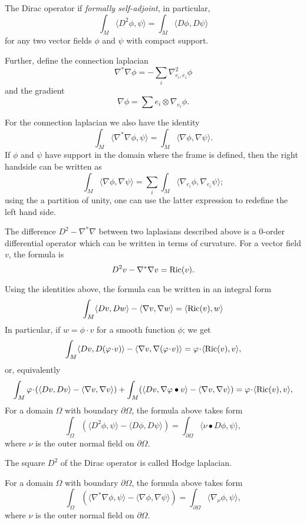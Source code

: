 The Dirac operator if \emph{formally self-adjoint}, in particular,
\[\int_M \langle D^2\phi,\psi\rangle=\int_M \langle D\phi,D\psi\rangle\]
for any two vector fields $\phi$ and $\psi$ with compact support.

Further, define the connection laplacian
\[\nabla^*\nabla\phi =-\sum_i\nabla^2_{e_i,e_i}\phi\]
and the gradient
\[\nabla \phi=\sum e_i\otimes \nabla_{e_i}\phi.\]

For the connection laplacian we also have the identity
\[\int_M \langle \nabla^*\nabla\phi,\psi\rangle
=
\int_M \langle \nabla\phi,\nabla\psi\rangle.\]
If $\phi$ and $\psi$ have support in the domain where the frame is defined, then the right handside can be written as 
\[\int_M \langle \nabla\phi,\nabla\psi\rangle=\sum_i\int_M\langle \nabla_{e_i}\phi,\nabla_{e_i}\psi\rangle;\]
using the a partition of unity, one can use the latter expression to redefine the left hand side. 

The difference $D^2-\nabla^*\nabla$ between two laplasians described above is a 0-order differential operator which can be written in terms of curvature.
For a vector field $v$, the formula is 
\[D^2v-\nabla^*\nabla v=\operatorname{\rm Ric}(v).\]

Using the identities above, the formula can be written in an integral form
\[\int_M \langle Dv,Dw\rangle -\langle \nabla v,\nabla w\rangle=\langle \operatorname{\rm Ric}(v),w\rangle\]
In particular, if $w=\phi \cdot v$ for a smooth function $\phi$;
we get
\[\int_M \langle Dv,D(\phi\cdot v)\rangle -\langle \nabla v,\nabla(\phi\cdot v) \rangle=\phi\cdot\langle \Ric(v), v\rangle,\]
or, equivalently
\[\int_M \phi\cdot(\langle Dv,D v\rangle -\langle \nabla v,\nabla v \rangle)
+
\int_M (\langle Dv,\nabla \phi \bullet v\rangle -\langle \nabla v,\nabla v \rangle)
=
\phi\cdot\langle \Ric(v), v\rangle,\]
For a domain $\Omega$ with boundary $\partial \Omega$, the formula above takes form
\[\int_\Omega (\langle D^2\phi,\psi\rangle- \langle D\phi,D\psi\rangle)
=
\int_{\partial \Omega}\langle \nu\bullet D\phi,\psi\rangle,\]
where $\nu$ is the outer normal field on $\partial \Omega$.

The square $D^2$ of the Dirac operator is called Hodge laplacian.


For a domain $\Omega$ with boundary $\partial \Omega$, the formula above takes form
\[\int_\Omega (\langle \nabla^*\nabla\phi,\psi\rangle-\langle \nabla\phi,\nabla\psi\rangle)
=
\int_{\partial \Omega}\langle \nabla_\nu \phi,\psi\rangle,\]
where $\nu$ is the outer normal field on $\partial \Omega$.

